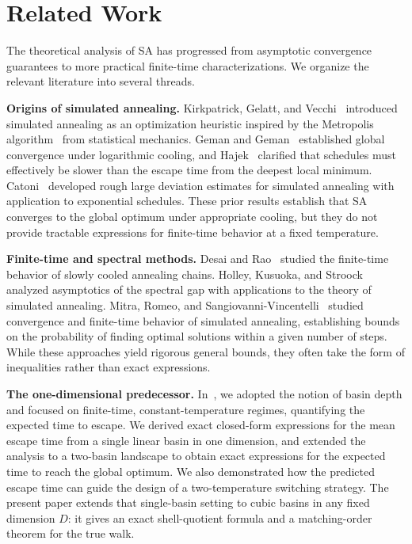 \documentclass[conference]{IEEEtran}
\begin{document}
\section{Related Work}

The theoretical analysis of SA has progressed from asymptotic convergence
guarantees to more practical finite-time characterizations.
We organize the relevant literature into several threads.

\textbf{Origins of simulated annealing.}
Kirkpatrick, Gelatt, and Vecchi~\cite{kirkpatrick1983} introduced simulated
annealing as an optimization heuristic inspired by the Metropolis
algorithm~\cite{metropolis1953} from statistical mechanics.
Geman and Geman~\cite{geman1984} established global convergence under
logarithmic cooling, and Hajek~\cite{hajek1988} clarified that schedules
must effectively be slower than the escape time from the deepest local minimum.
Catoni~\cite{catoni1992} developed rough large deviation estimates for
simulated annealing with application to exponential schedules.
These prior results establish that SA converges to the global optimum
under appropriate cooling, but they do not provide tractable expressions for
finite-time behavior at a fixed temperature.

\textbf{Finite-time and spectral methods.}
Desai and Rao~\cite{desai1997} studied the finite-time behavior of slowly
cooled annealing chains.
Holley, Kusuoka, and Stroock~\cite{holley1989} analyzed asymptotics of the
spectral gap with applications to the theory of simulated annealing.
Mitra, Romeo, and Sangiovanni-Vincentelli~\cite{mitra1986} studied convergence
and finite-time behavior of simulated annealing, establishing bounds on the
probability of finding optimal solutions within a given number of steps.
While these approaches yield rigorous general bounds, they often take the form
of inequalities rather than exact expressions.

\textbf{The one-dimensional predecessor.}
In~\cite{ramachandran2026}, we adopted the notion of basin depth and focused
on finite-time, constant-temperature regimes, quantifying the expected time to
escape.
We derived exact closed-form expressions for the mean escape time from a single
linear basin in one dimension, and extended the analysis to a two-basin landscape
to obtain exact expressions for the expected time to reach the global optimum.
We also demonstrated how the predicted escape time can guide the design of a
two-temperature switching strategy.
 The present paper extends that single-basin setting to cubic basins in any fixed dimension $D$: it gives an exact shell-quotient formula and a matching-order theorem for the true walk.
\end{document}
